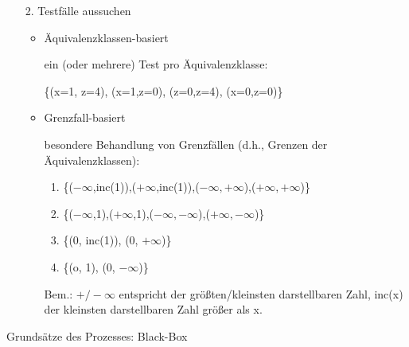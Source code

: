 \begin{enumerate}

\item[2.] Testf\"alle aussuchen

\begin{itemize}
\item \"Aquivalenzklassen-basiert

ein (oder mehrere) Test pro \"Aquivalenzklasse:

\{(x=1, z=4), (x=1,z=0), (z=0,z=4), (x=0,z=0)\}

\item Grenzfall-basiert

besondere Behandlung von Grenzf\"allen (d.h., Grenzen der
\"Aquivalenzklassen): 


\begin{enumerate}
\item \{($-\infty$,inc(1)),($+\infty$,inc(1)),($-\infty,+\infty$),($+\infty,+\infty$)\}
\item \{($-\infty$,1),($+\infty$,1),($-\infty,-\infty$),($+\infty,-\infty$)\}
\item \{(0, inc(1)), (0, $+\infty$)\}
\item \{(o, 1), (0, $-\infty$)\}

\end{enumerate}

Bem.: $+/-\infty$ entspricht der gr\"o{\ss}ten/kleinsten darstellbaren
Zahl, inc(x) der kleinsten darstellbaren Zahl gr\"o{\ss}er als x.


\end{itemize}

\end{enumerate}


\newpage
\centerline{Grunds\"atze des Prozesses: Black-Box}
\bigskip

